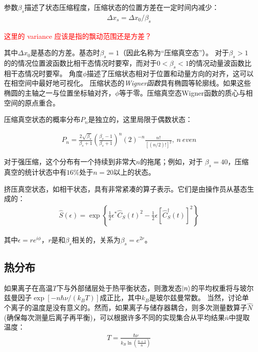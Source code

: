 参数$\beta_s$描述了状态压缩程度，压缩状态的位置方差在一定时间内减少：
\begin{align}
    \Delta x_s=\Delta x_0/\beta_s
\end{align}

\textcolor{red}{这里的 variance 应该是指的飘动范围还是方差？}

其中$\Delta x_0$是基态的方差。基态时$\beta_s=1$（因此名称为“压缩真空态”）。
对于$\beta_s>1$的的情况位置波函数比相干态情况时要窄，而对于$0<\beta_s<1$的情况动量波函数比相干态情况时要窄。
角度$\phi$描述了压缩状态相对于位置和动量方向的对齐，这可以在相空间中最好地可视化。
压缩状态的\emph{Wigner函数}具有椭圆等轮廓线\cite[]{Caldeira_Leggett_2002}。如果这些椭圆的主轴之一与位置坐标轴对齐，$\phi$等于零。压缩真空态Wigner函数的质心与相空间的原点重合。

压缩真空状态的概率分布$P_n$是独立的，这里局限于偶数状态：

\begin{align}
    P_n=\frac{2\sqrt{\beta_s}}{\beta_s+1} \left(\frac{\beta_s-1}{\beta_s+1}\right)^{n}(2)^{-n}\frac{n!}{[(n/2)!]^2},\ n\ even
\end{align}

对于强压缩，这个分布有一个持续到非常大$n$的拖尾；例如，对于 $\beta_s=40$，压缩真空的统计状态中有$16\%$处于$n=20$以上的状态。

挤压真空状态，如相干状态，具有非常紧凑的算子表示。它们是由操作员从基态生成的：
\begin{align}
    \hat{S}(\epsilon)=\exp\left\{\frac{1}{2}\epsilon^* \hat{C}_S(t)^2-\frac{1}{2}\epsilon [\hat{C}_S^\dagger(t)]^2\right\}
\end{align}

其中$\epsilon=r e^{i\phi}$，$r$是和$\beta_s$相关的，关系为$\beta_s=e^{2r}$。

\subsection[热分布]{热分布}

如果离子在高温$T$下与外部储层处于热平衡状态，则激发态$\ket{n}$的平均权重将与玻尔兹曼因子$\exp[-n\hbar\nu/(k_B T)]$成正比，其中$k_B$是玻尔兹曼常数。
当然，讨论单个离子的温度是没有意义的。然而，如果离子与储存器耦合，则多次测量数算子$\hat{N}$(确保每次测量后离子再平衡)，可以根据许多不同的实现集合从平均结果$\bar{n}$中提取温度：
\begin{align}
    T=\frac{\hbar\nu}{k_B\ln\left(\frac{\bar{n}+1}{\bar{n}}\right)}
\end{align}

